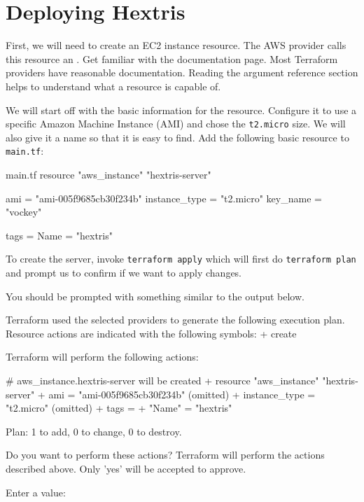 \documentclass{csse4400}
\begin{document}
\section{Deploying Hextris}
First, we will need to create an EC2 instance resource.
The AWS provider calls this resource an .
Get familiar with the documentation page.
Most Terraform providers have reasonable documentation.
Reading the argument reference section helps to understand what a resource is capable of.

We will start off with the basic information for the resource.
Configure it to use a specific Amazon Machine Instance (AMI) and chose the \texttt{t2.micro} size.
We will also give it a name so that it is easy to find.
Add the following basic resource to \texttt{main.tf}:

\begin{code}[language=terraform,numbers=none]{main.tf}
resource "aws_instance" "hextris-server" {
    ami           = "ami-005f9685cb30f234b"
    instance_type = "t2.micro"
    key_name      = "vockey"
    
    tags = {
        Name = "hextris"
    }
}      
\end{code}

To create the server, invoke
\texttt{terraform apply} which will first do \texttt{terraform plan} and prompt us to confirm if we want to apply changes.


You should be prompted with something similar to the output below.

\begin{code}[numbers=none]{}
Terraform used the selected providers to generate the following execution plan. Resource actions are indicated with the following symbols:
  + create

Terraform will perform the following actions:

  # aws_instance.hextris-server will be created
  + resource "aws_instance" "hextris-server" {
      + ami                                  = "ami-005f9685cb30f234b"
      (omitted)
      + instance_type                        = "t2.micro"
      (omitted)
      + tags                                 = {
          + "Name" = "hextris"
        }
    }

Plan: 1 to add, 0 to change, 0 to destroy.

Do you want to perform these actions?
  Terraform will perform the actions described above.
  Only 'yes' will be accepted to approve.

  Enter a value: 
\end{code}
\end{document}
